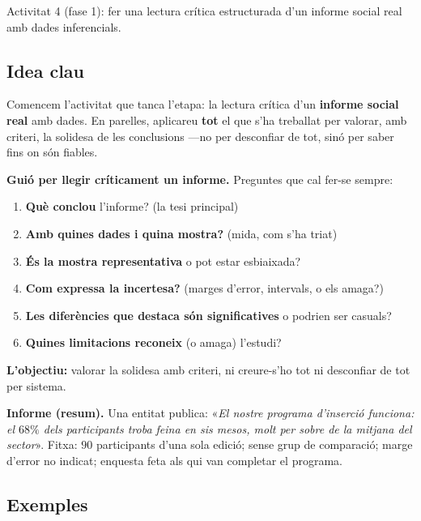 %
{Activitat 4 (fase 1): fer una lectura crítica estructurada d'un informe social real amb dades inferencials.}

\subsection{Idea clau}

Comencem l'activitat que tanca l'etapa: la lectura crítica d'un \textbf{informe social
real} amb dades. En parelles, aplicareu \textbf{tot} el que s'ha treballat per valorar, amb
criteri, la solidesa de les conclusions —no per desconfiar de tot, sinó per saber fins on
són fiables.

\begin{idea}
\textbf{Guió per llegir críticament un informe.} Preguntes que cal fer-se sempre:
\begin{enumerate}[leftmargin=1.6em, itemsep=2pt]
  \item \textbf{Què conclou} l'informe? (la tesi principal)
  \item \textbf{Amb quines dades i quina mostra?} (mida, com s'ha triat)
  \item \textbf{És la mostra representativa} o pot estar esbiaixada?
  \item \textbf{Com expressa la incertesa?} (marges d'error, intervals, o els amaga?)
  \item \textbf{Les diferències que destaca són significatives} o podrien ser casuals?
  \item \textbf{Quines limitacions reconeix} (o amaga) l'estudi?
\end{enumerate}
\textbf{L'objectiu:} valorar la solidesa amb criteri, ni creure-s'ho tot ni desconfiar de
tot per sistema.
\end{idea}

\noindent\textbf{Informe (resum).} Una entitat publica: «\emph{El nostre programa d'inserció
funciona: el $68\%$ dels participants troba feina en sis mesos, molt per sobre de la mitjana
del sector}». Fitxa: $90$ participants d'una sola edició; sense grup de comparació; marge
d'error no indicat; enquesta feta als qui van completar el programa.

\subsection{Exemples}


